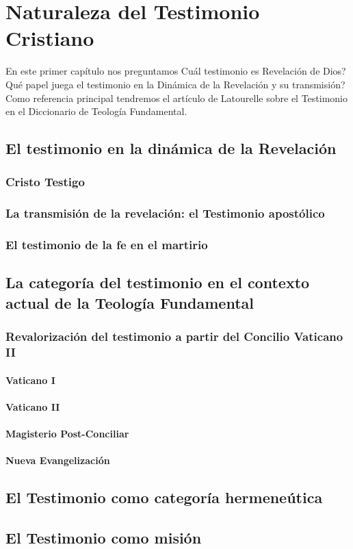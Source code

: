 \documentclass[../main.tex]{subfiles}
\begin{document}
\chapter{Naturaleza del Testimonio Cristiano}

En este primer capítulo nos preguntamos \textquestiondown{}Cuál testimonio es Revelación de Dios? \textquestiondown{}Qué papel juega el testimonio en la Dinámica de la Revelación y su transmisión? Como referencia principal tendremos el artículo de Latourelle sobre el Testimonio en el Diccionario de Teología Fundamental.

\section{El testimonio en la dinámica de la Revelación}

\subsection{Cristo Testigo}

\subsection{La transmisión de la revelación: el Testimonio apostólico}

\subsection{El testimonio de la fe en el martirio}

\section{La categoría del testimonio en el contexto actual de la Teología Fundamental}

\subsection{Revalorización del testimonio a partir del Concilio Vaticano II}

\subsubsection{Vaticano I}

\subsubsection{Vaticano II}

\subsubsection{Magisterio Post-Conciliar}

\subsubsection{Nueva Evangelización}

\section{El Testimonio como categoría hermeneútica}

\section{El Testimonio como misión}
\end{document}
